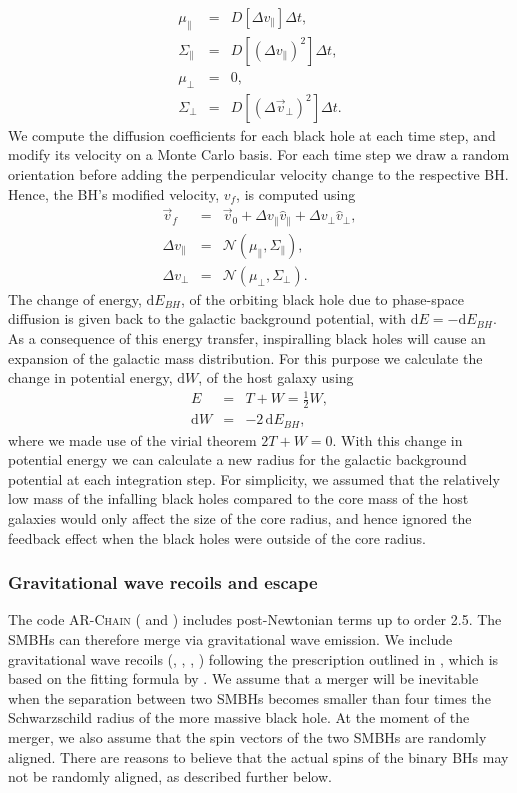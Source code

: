 \documentclass[fleqn,usenatbib,useAMS]{mnras}
\begin{document}
\begin{eqnarray}
\mu_\parallel &=& D[\Delta v_\parallel]\Delta t,\\
\Sigma_\parallel &=& D[(\Delta v_\parallel)^2]\Delta t,\\
\mu_\bot &=& 0,\\
\Sigma_\bot &=& D[(\Delta \vec{v}_\bot)^2]\Delta t.
\end{eqnarray}
We compute the diffusion coefficients for each black hole at each time step, and modify its velocity on a Monte Carlo basis. For each time step we draw a random orientation before adding the perpendicular velocity change to the respective BH. Hence, the BH's modified velocity, $v_f$, is computed using
\begin{eqnarray}
\vec{v}_f &=& \vec{v}_0 + \Delta v_\parallel \hat{v}_\parallel + \Delta v_\bot \hat{v}_\bot,\\
\Delta v_\parallel &=& \mathcal{N}(\mu_\parallel, \Sigma_\parallel),\\
\Delta v_\bot &=& \mathcal{N}(\mu_\bot, \Sigma_\bot).
\end{eqnarray}
The change of energy, $\mbox{d}E_{BH}$, of the orbiting black hole due to phase-space diffusion is given back to the galactic background potential, with $\mbox{d}E = -\mbox{d}E_{BH}$. As a consequence of this energy transfer, inspiralling black holes will cause an expansion of the galactic mass distribution. For this purpose we calculate the change in potential energy, $\mbox{d}W$, of the host galaxy using
\begin{eqnarray}
E &=& T + W = \frac{1}{2}W,\\
\mbox{d}W &=& -2\,\mbox{d}E_{BH},
\end{eqnarray}
where we made use of the virial theorem $2T+W =0$. With this change in potential energy we can calculate a new radius for the galactic background potential at each integration step. For simplicity, we assumed that the relatively low mass of the infalling black holes compared to the core mass of the host galaxies would only affect the size of the core radius, and hence ignored the feedback effect when the black holes were outside of the core radius.

\subsubsection{Gravitational wave recoils and escape}
The code \textsc{AR-Chain} (\citet{2006MNRAS.372..219M} and \citet{2008AJ....135.2398M}) includes post-Newtonian terms up to order 2.5. The SMBHs can therefore merge via gravitational wave emission. We include gravitational wave recoils (\citet{2007ApJ...659L...5C}, \citet{2011PhRvD..83b4003L}, \citet{2013PhRvD..87h4027L}, \citet{2012ApJ...744...45B}) following the prescription outlined in \citet{2015ApJ...799..178K}, which is based on the fitting formula by \citet{2012PhRvD..85h4015L}.  We assume that a merger will be inevitable when the separation between two SMBHs becomes smaller than four times the Schwarzschild radius of the more massive black hole.  At the moment of the merger, we also assume that the spin vectors of the two SMBHs are randomly aligned.  There are reasons to believe that the actual spins of the binary BHs may not be randomly aligned, as described further below.
\end{document}

